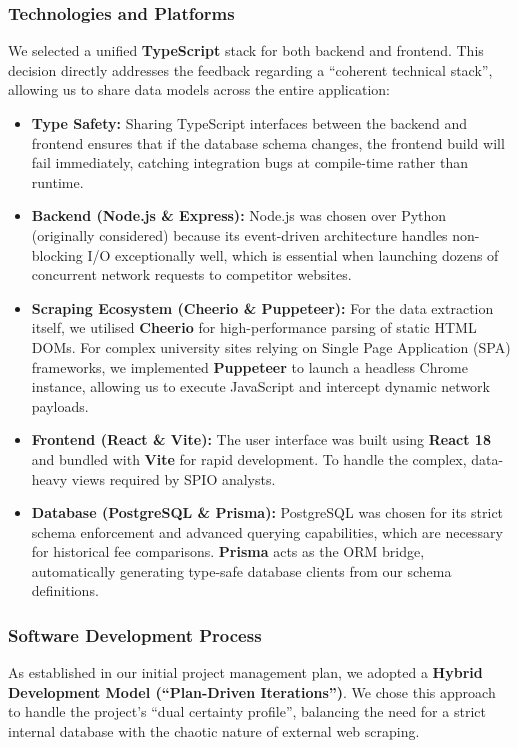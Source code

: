 \subsubsection{Technologies and Platforms}
We selected a unified \textbf{TypeScript} stack for both backend and frontend. This decision directly addresses the feedback regarding a ``coherent technical stack'', allowing us to share data models across the entire application:

\begin{itemize}
    \item \textbf{Type Safety:} Sharing TypeScript interfaces between the backend and frontend ensures that if the database schema changes, the frontend build will fail immediately, catching integration bugs at compile-time rather than runtime.
    \item \textbf{Backend (Node.js \& Express):} Node.js was chosen over Python (originally considered) because its event-driven architecture handles non-blocking I/O exceptionally well, which is essential when launching dozens of concurrent network requests to competitor websites.
    \item \textbf{Scraping Ecosystem (Cheerio \& Puppeteer):} For the data extraction itself, we utilised \textbf{Cheerio} for high-performance parsing of static HTML DOMs. For complex university sites relying on Single Page Application (SPA) frameworks, we implemented \textbf{Puppeteer} to launch a headless Chrome instance, allowing us to execute JavaScript and intercept dynamic network payloads.
    \item \textbf{Frontend (React \& Vite):} The user interface was built using \textbf{React 18} and bundled with \textbf{Vite} for rapid development. To handle the complex, data-heavy views required by SPIO analysts.
    \item \textbf{Database (PostgreSQL \& Prisma):} PostgreSQL was chosen for its strict schema enforcement and advanced querying capabilities, which are necessary for historical fee comparisons. \textbf{Prisma} acts as the ORM bridge, automatically generating type-safe database clients from our schema definitions.
\end{itemize}

\subsubsection{Software Development Process}
As established in our initial project management plan, we adopted a \textbf{Hybrid Development Model (``Plan-Driven Iterations'')}. We chose this approach to handle the project's ``dual certainty profile'', balancing the need for a strict internal database with the chaotic nature of external web scraping.

